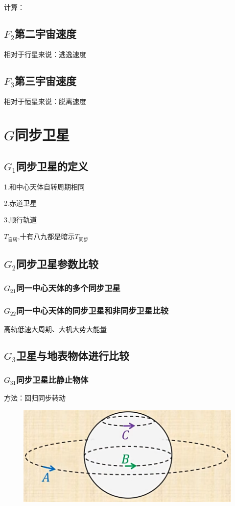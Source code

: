 \documentclass[lang=cn,10pt]{elegantbook}
\begin{document}
	       计算：
	       
	       \subsection{$F_2$第二宇宙速度}
	       相对于行星来说：逃逸速度
	       \subsection{$F_3$第三宇宙速度}
	       相对于恒星来说：脱离速度
	       \section{$G$同步卫星}
	       \subsection{$G_1$同步卫星的定义}
	       
	       1.和中心天体自转周期相同
	       
	       2.赤道卫星
	       
	       3.顺行轨道
	       
	       \begin{remark}
	       	$T_\text{自转}$,十有八九都是暗示$T_\text{同步}$
	       \end{remark}
	       \subsection{$G_2$同步卫星参数比较}
	       \subsubsection{$G_{21}$同一中心天体的多个同步卫星}
	       
	       \vspace{3cm}
	       
	       \subsubsection{$G_{22}$同一中心天体的同步卫星和非同步卫星比较}
	       高轨低速大周期、大机大势大能量
	       
	       \subsection{$G_3$卫星与地表物体进行比较}
	        \subsubsection{$G_{31}$同步卫星比静止物体}
	        方法：回归同步转动
	       \begin{figure}[H]
	       	\centering
	       	\includegraphics[width=0.3\linewidth]{image/52}
	       \end{figure}
	       \vspace{3cm}
	       
\end{document}

